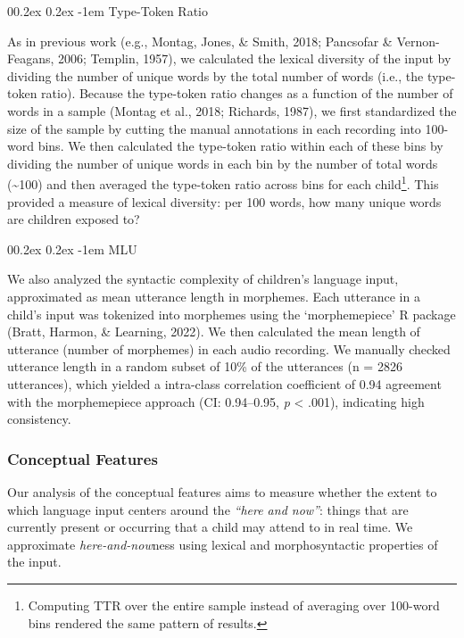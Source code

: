 \documentclass[
  man,floatsintext]{apa6}
\makeatletter
\let\oldparagraph\paragraph
\renewcommand{\paragraph}[1]{\oldparagraph{#1}\mbox{}}
\renewcommand{\paragraph}{\@startsection{paragraph}{4}{\parindent}%
  {0\baselineskip \@plus 0.2ex \@minus 0.2ex}%
  {-1em}%
  {\normalfont\normalsize\bfseries\itshape\typesectitle}}
\makeatother
\begin{document}
\hypertarget{type-token-ratio}{%
\paragraph{Type-Token Ratio}\label{type-token-ratio}}

As in previous work (e.g., Montag, Jones, \& Smith, 2018; Pancsofar \& Vernon-Feagans, 2006; Templin, 1957), we calculated the lexical diversity of the input by dividing the number of unique words by the total number of words (i.e., the type-token ratio). Because the type-token ratio changes as a function of the number of words in a sample (Montag et al., 2018; Richards, 1987), we first standardized the size of the sample by cutting the manual annotations in each recording into 100-word bins. We then calculated the type-token ratio within each of these bins by dividing the number of unique words in each bin by the number of total words (\textasciitilde100) and then averaged the type-token ratio across bins for each child\footnote{Computing TTR over the entire sample instead of averaging over 100-word bins rendered the same pattern of results.}. This provided a measure of lexical diversity: per 100 words, how many unique words are children exposed to?

\hypertarget{mlu}{%
\paragraph{MLU}\label{mlu}}

We also analyzed the syntactic complexity of children's language input, approximated as mean utterance length in morphemes. Each utterance in a child's input was tokenized into morphemes using the `morphemepiece' R package (Bratt, Harmon, \& Learning, 2022). We then calculated the mean length of utterance (number of morphemes) in each audio recording. We manually checked utterance length in a random subset of 10\% of the utterances (n = 2826 utterances), which yielded a intra-class correlation coefficient of 0.94 agreement with the morphemepiece approach (CI: 0.94--0.95, \emph{p} \textless{} .001), indicating high consistency.

\hypertarget{conceptual-features}{%
\subsubsection{Conceptual Features}\label{conceptual-features}}

Our analysis of the conceptual features aims to measure whether the extent to which language input centers around the \emph{``here and now''}: things that are currently present or occurring that a child may attend to in real time. We approximate \emph{here-and-now}ness using lexical and morphosyntactic properties of the input.
\end{document}
